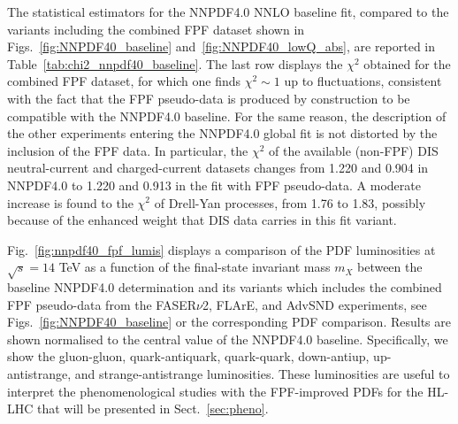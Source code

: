The statistical estimators for the NNPDF4.0 NNLO
baseline fit, compared to the variants including
the combined FPF dataset shown in Figs.~\ref{fig:NNPDF40_baseline}
and~\ref{fig:NNPDF40_lowQ_abs}, are reported in Table~\ref{tab:chi2_nnpdf40_baseline}.
%
The last row displays the $\chi^2$ obtained for the combined FPF dataset,
for which one finds $\chi^2 \sim 1$ up to fluctuations, consistent
with the fact that the FPF pseudo-data
is produced by construction to be compatible with the NNPDF4.0 baseline.
%
For the same reason, the description of the other experiments entering
the NNPDF4.0 global fit is not distorted by the inclusion of the FPF data.
%
In particular, the $\chi^2$ of the available (non-FPF) DIS neutral-current and charged-current
datasets changes from 1.220 and 0.904 in NNPDF4.0 to 1.220 and 0.913 in the fit
with FPF pseudo-data.
%
A moderate increase is found to the $\chi^2$ of Drell-Yan processes, from 1.76 to 1.83, possibly
because of the enhanced weight that DIS data carries in this fit variant.

Fig.~\ref{fig:nnpdf40_fpf_lumis} displays a comparison of the PDF luminosities at $\sqrt{s}=14$ TeV
as a function of the final-state invariant mass $m_X$ between
the baseline NNPDF4.0 determination and its variants which includes
the combined FPF pseudo-data from the FASER$\nu$2, FLArE, and AdvSND experiments,
see Figs.~\ref{fig:NNPDF40_baseline} or the corresponding PDF comparison.
%
Results are shown normalised to the central value of the NNPDF4.0 baseline.
%
Specifically, we show the gluon-gluon, quark-antiquark, 
quark-quark, down-antiup, up-antistrange, and strange-antistrange  luminosities.
%
These luminosities are useful to interpret the phenomenological studies with the FPF-improved
PDFs for the HL-LHC that will be presented in Sect.~\ref{sec:pheno}.

